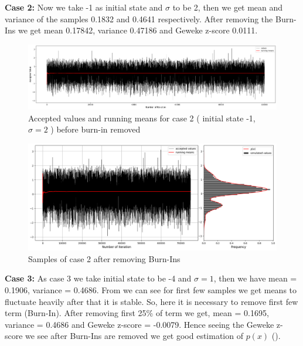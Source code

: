 \begin{example}
    \textbf{Case 2:}  Now we take -1 as initial state and $ \sigma $ to be 2, then we get mean and variance of the samples 0.1832 and 0.4641 respectively. After removing the Burn-Ins we get mean 0.17842, variance 0.47186 and Geweke z-score 0.0111.

    \begin{figure}[H]
        \centering
        \includegraphics[width=1\textwidth]{./images/metropolis/sample-2-values.png}
        \caption{Accepted values and running means for case 2 ( initial state -1, $ \sigma = 2 $ ) before burn-in removed}
    \end{figure}

    \begin{figure}[H]
        \centering
        \includegraphics[width=1\textwidth]{./images/metropolis/sample-2-value-hist-bo.png}
        \caption{Samples of case 2 after removing Burn-Ins}
    \end{figure}

    \textbf{Case 3:} As case 3 we take initial state to be -4 and $ \sigma = 1$, then we have mean = 0.1906, variance = 0.4686. From  we can see for first few samples we get means to fluctuate heavily after that it is stable. So, here it is necessary to remove first few term (Burn-In). After removing first 25\% of term we get, mean = 0.1695, variance = 0.4686 and Geweke z-score = -0.0079. Hence seeing the Geweke z-score we see after Burn-Ins are removed we get good estimation of $ p(x) $ ().


\end{example}
